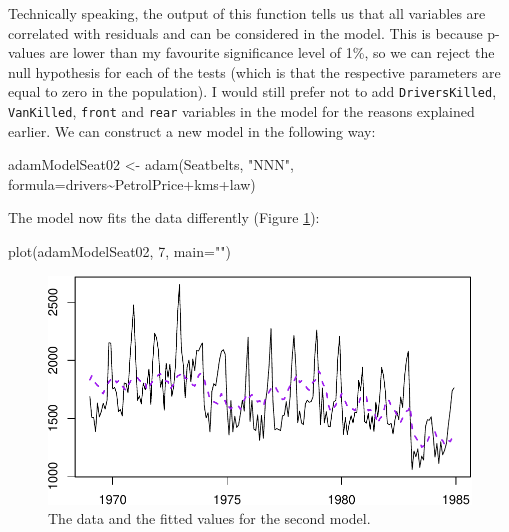 \documentclass[
]{book}
\newenvironment{Shaded}{\begin{snugshade}}{\end{snugshade}}
\newcommand{\AttributeTok}[1]{\textcolor[rgb]{0.77,0.63,0.00}{#1}}
\newcommand{\DecValTok}[1]{\textcolor[rgb]{0.00,0.00,0.81}{#1}}
\newcommand{\FunctionTok}[1]{\textcolor[rgb]{0.00,0.00,0.00}{#1}}
\newcommand{\NormalTok}[1]{#1}
\newcommand{\OtherTok}[1]{\textcolor[rgb]{0.56,0.35,0.01}{#1}}
\newcommand{\SpecialCharTok}[1]{\textcolor[rgb]{0.00,0.00,0.00}{#1}}
\newcommand{\StringTok}[1]{\textcolor[rgb]{0.31,0.60,0.02}{#1}}
\theoremstyle{definition}
\theoremstyle{definition}
\theoremstyle{definition}
\theoremstyle{definition}
\theoremstyle{remark}
\begin{document}
Technically speaking, the output of this function tells us that all variables are correlated with residuals and can be considered in the model. This is because p-values are lower than my favourite significance level of 1\%, so we can reject the null hypothesis for each of the tests (which is that the respective parameters are equal to zero in the population). I would still prefer not to add \texttt{DriversKilled}, \texttt{VanKilled}, \texttt{front} and \texttt{rear} variables in the model for the reasons explained earlier. We can construct a new model in the following way:

\begin{Shaded}
\begin{Highlighting}[]
\NormalTok{adamModelSeat02 }\OtherTok{\textless{}{-}} \FunctionTok{adam}\NormalTok{(Seatbelts, }\StringTok{"NNN"}\NormalTok{,}
                        \AttributeTok{formula=}\NormalTok{drivers}\SpecialCharTok{\textasciitilde{}}\NormalTok{PetrolPrice}\SpecialCharTok{+}\NormalTok{kms}\SpecialCharTok{+}\NormalTok{law)}
\end{Highlighting}
\end{Shaded}

The model now fits the data differently (Figure \ref{fig:adamModelSeat02}):

\begin{Shaded}
\begin{Highlighting}[]
\FunctionTok{plot}\NormalTok{(adamModelSeat02, }\DecValTok{7}\NormalTok{, }\AttributeTok{main=}\StringTok{""}\NormalTok{)}
\end{Highlighting}
\end{Shaded}

\begin{figure}
\centering
\includegraphics{Svetunkov--2022----ADAM_files/figure-latex/adamModelSeat02-1.pdf}
\caption{\label{fig:adamModelSeat02}The data and the fitted values for the second model.}
\end{figure}
\end{document}
